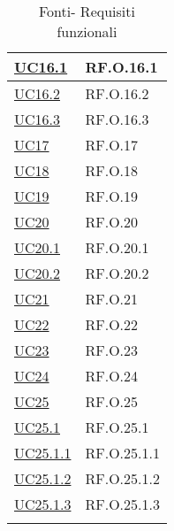 \begin{longtable}{|P{4,5cm}|>{\arraybackslash}P{9cm}|}
  \hyperref[UC16point1]{UC16.1} & RF.O.16.1 \\
  \hline
  \hyperref[UC16point2]{UC16.2} & RF.O.16.2 \\
  \hline
  \hyperref[UC16point3]{UC16.3} & RF.O.16.3 \\
  \hline
  \hyperref[UC17]{UC17} & RF.O.17 \\
  \hline
  \hyperref[UC18]{UC18} & RF.O.18 \\
  \hline
  \hyperref[UC19]{UC19} & RF.O.19 \\
  \hline
  \hyperref[UC20]{UC20} & RF.O.20 \\
  \hline
  \hyperref[UC20point1]{UC20.1} & RF.O.20.1 \\
  \hline
  \hyperref[UC20point2]{UC20.2} & RF.O.20.2 \\
  \hline
  \hyperref[UC21]{UC21} & RF.O.21 \\
  \hline
  \hyperref[UC22]{UC22} & RF.O.22 \\
  \hline
  \hyperref[UC23]{UC23} & RF.O.23 \\
  \hline
  \hyperref[UC24]{UC24} & RF.O.24 \\
  \hline
  \hyperref[UC25]{UC25} & RF.O.25 \\
  \hline
  \hyperref[UC25point1]{UC25.1} & RF.O.25.1 \\
  \hline
  \hyperref[UC25point1point1]{UC25.1.1} & RF.O.25.1.1 \\
  \hline
  \hyperref[UC25poin1point2]{UC25.1.2} & RF.O.25.1.2 \\
  \hline
  \hyperref[UC25poin1point3]{UC25.1.3} & RF.O.25.1.3 \\
  \hline
\caption{Fonti- Requisiti funzionali}
\end{longtable}
